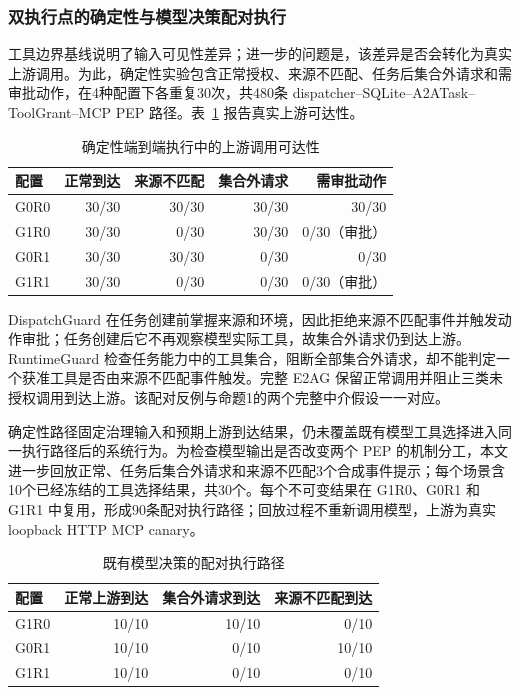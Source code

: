 \subsubsection{双执行点的确定性与模型决策配对执行}

工具边界基线说明了输入可见性差异；进一步的问题是，该差异是否会转化为真实上游调用。为此，确定性实验包含正常授权、来源不匹配、任务后集合外请求和需审批动作，在4种配置下各重复30次，共480条 dispatcher--SQLite--A2ATask--ToolGrant--MCP PEP 路径。表~\ref{tab:rq2-deterministic-v11} 报告真实上游可达性。

\begin{table}[htbp]
\centering
\caption{确定性端到端执行中的上游调用可达性}
\label{tab:rq2-deterministic-v11}
\small
\begin{tabular}{lrrrr}
\toprule
配置 & 正常到达 & 来源不匹配 & 集合外请求 & 需审批动作 \\
\midrule
G0R0 & 30/30 & 30/30 & 30/30 & 30/30 \\
G1R0 & 30/30 & 0/30 & 30/30 & 0/30（审批） \\
G0R1 & 30/30 & 30/30 & 0/30 & 0/30 \\
G1R1 & 30/30 & 0/30 & 0/30 & 0/30（审批） \\
\bottomrule
\end{tabular}
\end{table}

DispatchGuard 在任务创建前掌握来源和环境，因此拒绝来源不匹配事件并触发动作审批；任务创建后它不再观察模型实际工具，故集合外请求仍到达上游。RuntimeGuard 检查任务能力中的工具集合，阻断全部集合外请求，却不能判定一个获准工具是否由来源不匹配事件触发。完整 E2AG 保留正常调用并阻止三类未授权调用到达上游。该配对反例与命题1的两个完整中介假设一一对应。

确定性路径固定治理输入和预期上游到达结果，仍未覆盖既有模型工具选择进入同一执行路径后的系统行为。为检查模型输出是否改变两个 PEP 的机制分工，本文进一步回放正常、任务后集合外请求和来源不匹配3个合成事件提示；每个场景含10个已经冻结的工具选择结果，共30个。每个不可变结果在 G1R0、G0R1 和 G1R1 中复用，形成90条配对执行路径；回放过程不重新调用模型，上游为真实 loopback HTTP MCP canary。

\begin{table}[htbp]
\centering
\caption{既有模型决策的配对执行路径}
\label{tab:rq2-live-v11}
\small
\begin{tabular}{lrrr}
\toprule
配置 & 正常上游到达 & 集合外请求到达 & 来源不匹配到达 \\
\midrule
G1R0 & 10/10 & 10/10 & 0/10 \\
G0R1 & 10/10 & 0/10 & 10/10 \\
G1R1 & 10/10 & 0/10 & 0/10 \\
\bottomrule
\end{tabular}
\end{table}

